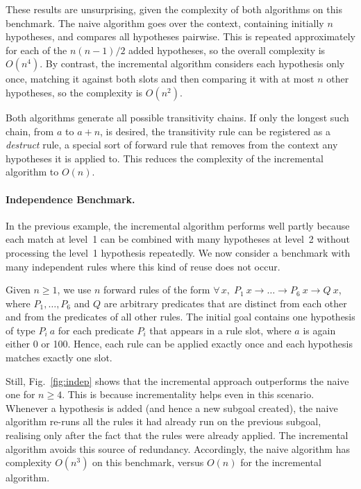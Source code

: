 \documentclass[runningheads,leqno]{llncs}
\newcommand{\para}[1]{\paragraph{\bfseries\upshape #1}}
\newcommand{\All}[2]{\ensuremath{\forall\, #1,\; #2}}
\begin{document}
These results are unsurprising, given the complexity of both algorithms on this benchmark.
The naive algorithm goes over the context, containing initially $n$ hypotheses, and compares all hypotheses pairwise.
This is repeated approximately for each of the $n(n-1)/2$ added hypotheses, so the overall complexity is $O(n^4)$.
By contrast, the incremental algorithm considers each hypothesis only once, matching it against both slots and then comparing it with at most $n$ other hypotheses, so the complexity is $O(n^{2})$.

Both algorithms generate all possible transitivity chains.
If only the longest such chain, from $a$ to $a + n$, is desired, the transitivity rule can be registered as a \emph{destruct} rule, a special sort of forward rule that removes from the context any hypotheses it is applied to.
This reduces the complexity of the incremental algorithm to $O(n)$.

\para{Independence Benchmark.}
In the previous example, the incremental algorithm performs well partly because each match at level~1 can be combined with many hypotheses at level~2 without processing the level~1 hypothesis repeatedly.
We now consider a benchmark with many independent rules where this kind of reuse does not occur.

Given $n ≥ 1$, we use $n$ forward rules of the form $\All{x}{P_{1}~x → \dots → P_{6}~x → Q~x}$, where $P_{1}, \dots, P_{6}$ and $Q$ are arbitrary predicates that are distinct from each other and from the predicates of all other rules.
The initial goal contains one hypothesis of type $P_{i}~a$ for each predicate $P_{i}$ that appears in a rule slot, where $a$ is again either 0 or 100.
Hence, each rule can be applied exactly once and each hypothesis matches exactly one slot.

Still, Fig.~\ref{fig:indep} shows that the incremental approach outperforms the naive one for $n ≥ 4$.
This is because incrementality helps even in this scenario.
Whenever a hypothesis is added (and hence a new subgoal created), the naive algorithm re-runs all the rules it had already run on the previous subgoal, realising only after the fact that the rules were already applied.
The incremental algorithm avoids this source of redundancy.
Accordingly, the naive algorithm has complexity $O(n^{3})$ on this benchmark, versus $O(n)$ for the incremental algorithm.
\end{document}
